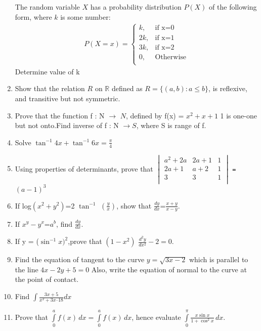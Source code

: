 \documentclass{article}
\begin{document}
\begin{enumerate}
The random variable $X$ has a probability distribution $P(X)$ of the following form, where $k$ is some number:
\begin{align*}
P(X = x) = 
\begin{cases}
    k , & \text{if x=0} \\
    2k , & \text{if x=1} \\
    3k , & \text{if x=2} \\
    0 , & \text{Otherwise} \\      
\end{cases}
\end{align*}
\text Determine value of k 
\item Show that the relation $R$ on $\mathbb{R}$ defined as $R = \{(a, b) : a \leq b\}$, is reflexive, and transitive but not symmetric.
\item Prove that the function f : N $\xrightarrow{}$ $N$, defined by f(x) = ${x^2}+x+1$ 1 is one-one but not onto.Find inverse of f : N $\xrightarrow{} S$, where S is range of f.
\item Solve ${\tan^{-1}4x}+{\tan^{-1}6x} = \frac{\pi}{4}$
\item Using properties of determinants, prove that 
$\begin{vmatrix}
    {a^2+2a} & {2a+1}& {1}\\
    {2a+1} & {a+2} & 1 \\
    3 & 3 & 1 \\
\end{vmatrix}$
\texttt=$(a-1)^3$
\item If log$(x^2+y^2)$=2 $\tan^{-1}$ $(\frac{y}{x})$, show that $\frac{dy}{dx}$=$\frac{x+y}{x-y}$.
\item If ${x^y-y^x}$=$a^b$, find $\frac{dy}{dx}$.
\item If y = ($\sin^{-1}x)^2$,prove that $(1-x^2)$ $\frac{d^2y}{dx^2}-2=0$.
\item Find the equation of tangent to the curve $y=\sqrt{3x-2}$ which is parallel to the line $4x-2y+5=0$ Also, write the equation of normal to the curve at the point of contact.
\item  Find $\int \frac{3x + 5}{x^2+ 3x – 18}dx$
\item Prove that $\int\limits_{0}^{a} f(x) \,dx = \int\limits_{0}^{a} f(x) \,dx$, hence evaluate $\int\limits_{0}^{\pi} \frac{x\sin x}{1 + \cos^2 x} \,dx$.


\end{enumerate}
\end{document}
